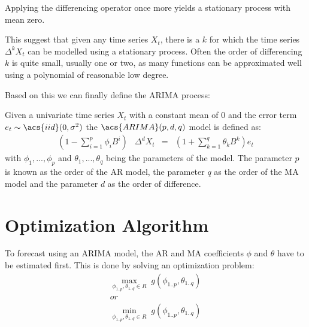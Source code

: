Applying the differencing operator once more yields a stationary process with mean zero.

This suggest that given any time series $X_t$, there is a $k$ for which the time series $\Delta^k X_t$ can be modelled using a stationary process. Often the order of differencing $k$ is quite small, usually one or two, as many functions can be approximated well using a polynomial of reasonable low degree. \textsuperscript{\cite[p.~30]{Brockwell2002Introduction2nd}}

Based on this we can finally define the \acs{ARIMA} process:
\begin{definition}\label{def:arima}
    Given a univariate time series \(X_t\) with a constant mean of 0 and the error term $e_t \sim \acs{iid}(0, \sigma^2) $ the $\acs{ARIMA}(p,d,q)$ model is defined as:\textsuperscript{\cite[p.~55]{Brockwell2002Introduction2nd}}
    \begin{equation}\label{eq:ARIMA_p_d_q}
        \begin{array}{lccl}
            (1-\displaystyle\sum_{i=1}^{p} \phi_i B^i) & \Delta^d X_t & = & (1+\displaystyle\sum_{k=1}^{q} \theta_k B^k)e_t
        \end{array}
    \end{equation}
    with $\phi_1, ..., \phi_p$ and $\theta_1, ..., \theta_q$ being the parameters of the model. The parameter $p$ is known as the order of the \acl{AR} model, the parameter $q$ as the order of the \acl{MA} model and the parameter $d$ as the order of difference. 
\end{definition}


\section{Optimization Algorithm}\label{optimalgorithms}

To forecast using an \acs{ARIMA} model, the \acs{AR} and \acs{MA} coefficients $\phi$ and $\theta$ have to be estimated first. This is done by solving an optimization problem:
\begin{equation}\label{eq:minmax_g}
\begin{array}{c}
\displaystyle\max_{\phi_{1..p}, \theta_{1..q} \in R} \; g(\phi_{1..p}, \theta_{1..q})\\
or \\
\displaystyle\min_{\phi_{1..p}, \theta_{1..q} \in R} \; g(\phi_{1..p}, \theta_{1..q})
\end{array}
\end{equation}

